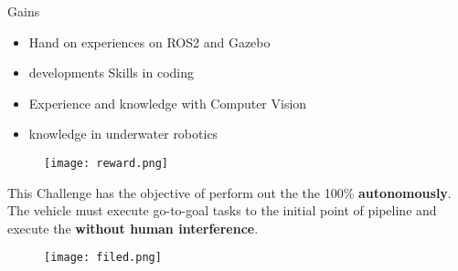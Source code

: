\begin{frame}[t]{Gains}
    \begin{itemize}
        \item Hand on experiences on ROS2 and Gazebo
        \item developments Skills in coding
        \item Experience and knowledge with Computer Vision
        \item knowledge in underwater robotics
    \end{itemize}


    \begin{center}
        \begin{figure}
            \texttt{[image: reward.png]}               
           
        \end{figure}
    
        \end{center}
   
\end{frame}

\begin{frame}{}
    \transdissolve[duration=0.5]
   
    \begin{center}
    \end{center}
\end{frame}



\begin{frame}{}

    This Challenge has the objective of perform out the the  100\% \textbf{autonomously}. The vehicle must execute go-to-goal tasks to the initial point of pipeline and execute the  \textbf{without human interference}.
   
    \begin{center}
        \begin{figure}
            \texttt{[image: filed.png]}               
           
        \end{figure}
    
        \end{center}
\end{frame}

